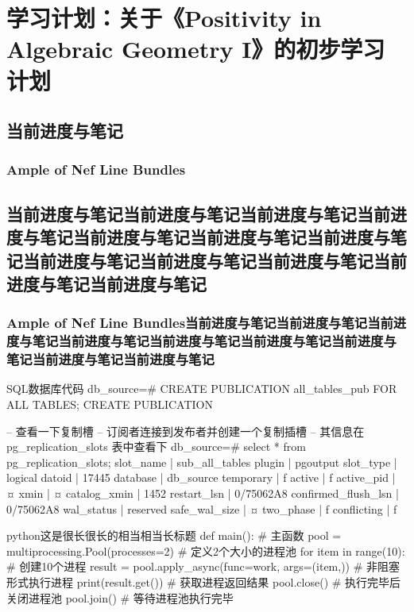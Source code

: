 \documentclass[lang=cn,12pt,fontset=none,a4paper]{beautybook}
\begin{document}
\chapter{学习计划：关于《Positivity in Algebraic Geometry I》的初步学习计划}
\section{当前进度与笔记}
\subsection{Ample of Nef Line Bundles}

\section[短标题用于页眉]{当前进度与笔记当前进度与笔记当前进度与笔记当前进度与笔记当前进度与笔记当前进度与笔记当前进度与笔记当前进度与笔记当前进度与笔记当前进度与笔记当前进度与笔记当前进度与笔记}
\subsection{Ample of Nef Line Bundles当前进度与笔记当前进度与笔记当前进度与笔记当前进度与笔记当前进度与笔记当前进度与笔记当前进度与笔记当前进度与笔记当前进度与笔记}


\begin{maccode}{SQL}{数据库代码}
    db_source=# CREATE PUBLICATION all_tables_pub FOR ALL TABLES;
    CREATE PUBLICATION
    
    -- 查看一下复制槽
    -- 订阅者连接到发布者并创建一个复制插槽
    -- 其信息在 pg_replication_slots 表中查看下
    db_source=# select * from pg_replication_slots;
    slot_name           | sub_all_tables
    plugin              | pgoutput
    slot_type           | logical
    datoid              | 17445
    database            | db_source
    temporary           | f
    active              | f
    active_pid          | ¤
    xmin                | ¤
    catalog_xmin        | 1452
    restart_lsn         | 0/75062A8
    confirmed_flush_lsn | 0/75062A8
    wal_status          | reserved
    safe_wal_size       | ¤
    two_phase           | f
    conflicting         | f
\end{maccode}

\begin{maccode}{python}{这是很长很长的相当相当长标题}
def main(): # 主函数
    pool = multiprocessing.Pool(processes=2) # 定义2个大小的进程池
    for item in range(10): # 创建10个进程
        result = pool.apply_async(func=work, args=(item,)) # 非阻塞形式执行进程
        print(result.get()) # 获取进程返回结果
    pool.close() # 执行完毕后关闭进程池
    pool.join() # 等待进程池执行完毕
\end{maccode}
\end{document}
